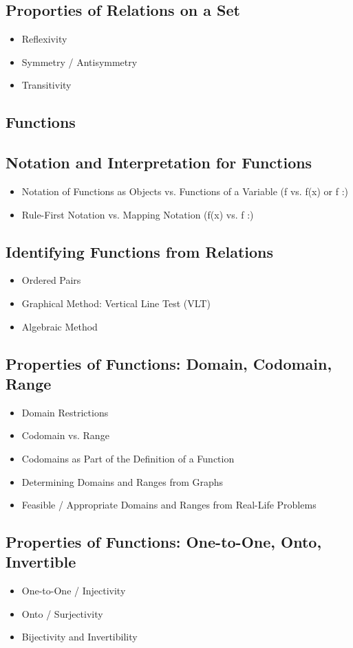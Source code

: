 \documentclass[11pt]{article}
\begin{document}
\subsection{Proporties of Relations on a Set}
\begin{itemize}
    \item Reflexivity
    \item Symmetry / Antisymmetry
    \item Transitivity
\end{itemize}
\subsection{Functions}
\subsection{Notation and Interpretation for Functions}
\begin{itemize}
    \item Notation of Functions as Objects vs. Functions of a Variable (f vs. f(x) or f :)
    \item Rule-First Notation vs. Mapping Notation (f(x) vs. f :)
\end{itemize}
\subsection{Identifying Functions from Relations}
\begin{itemize}
    \item Ordered Pairs
    \item Graphical Method: Vertical Line Test (VLT)
    \item Algebraic Method
\end{itemize}
\subsection{Properties of Functions: Domain, Codomain, Range}
\begin{itemize}
    \item Domain Restrictions
    \item Codomain vs. Range
    \item Codomains as Part of the Definition of a Function
    \item Determining Domains and Ranges from Graphs
    \item Feasible / Appropriate Domains and Ranges from Real-Life Problems
\end{itemize}
\subsection{Properties of Functions: One-to-One, Onto, Invertible}
\begin{itemize}
    \item One-to-One / Injectivity
    \item Onto / Surjectivity
    \item Bijectivity and Invertibility
\end{itemize}
\end{document}
